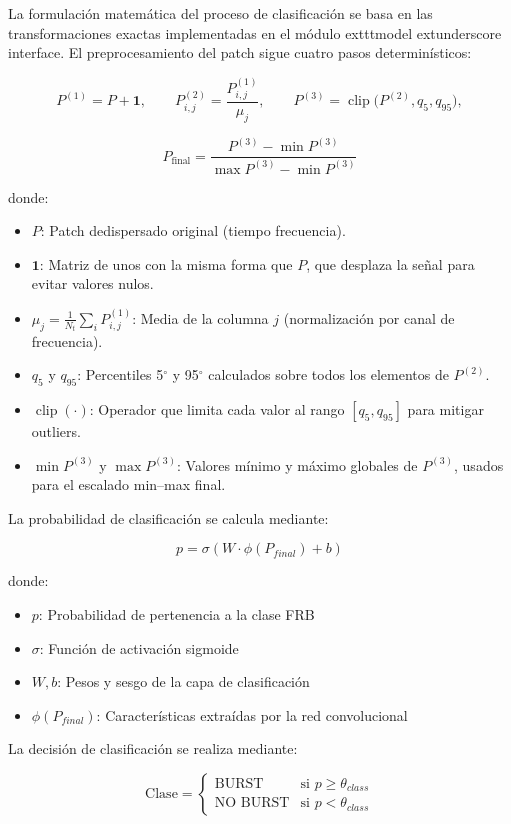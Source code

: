 La formulación matemática del proceso de clasificación se basa en las transformaciones exactas implementadas en el módulo 	exttt{model	extunderscore interface}. El preprocesamiento del patch sigue cuatro pasos determinísticos:

\[
P^{(1)} = P + \mathbf{1}, \qquad
P^{(2)}_{i,j} = \frac{P^{(1)}_{i,j}}{\mu_j}, \qquad
P^{(3)} = \operatorname{clip}\big(P^{(2)}, q_{5}, q_{95}\big),
\]

\[
P_{\text{final}} = \frac{P^{(3)} - \min P^{(3)}}{\max P^{(3)} - \min P^{(3)}}
\]

donde:
\begin{itemize}
    \item $P$: Patch dedispersado original (tiempo \texttimes{} frecuencia).
    \item $\mathbf{1}$: Matriz de unos con la misma forma que $P$, que desplaza la señal para evitar valores nulos.
    \item $\mu_j = \frac{1}{N_t} \sum_i P^{(1)}_{i,j}$: Media de la columna $j$ (normalización por canal de frecuencia).
    \item $q_{5}$ y $q_{95}$: Percentiles 5$^{\circ}$ y 95$^{\circ}$ calculados sobre todos los elementos de $P^{(2)}$.
    \item $\operatorname{clip}(\cdot)$: Operador que limita cada valor al rango $[q_{5}, q_{95}]$ para mitigar outliers.
    \item $\min P^{(3)}$ y $\max P^{(3)}$: Valores mínimo y máximo globales de $P^{(3)}$, usados para el escalado min--max final.
\end{itemize}

La probabilidad de clasificación se calcula mediante:

\[
p = \sigma(W \cdot \phi(P_{final}) + b)
\]

donde:
\begin{itemize}
    \item $p$: Probabilidad de pertenencia a la clase FRB
    \item $\sigma$: Función de activación sigmoide
    \item $W, b$: Pesos y sesgo de la capa de clasificación
    \item $\phi(P_{final})$: Características extraídas por la red convolucional
\end{itemize}

La decisión de clasificación se realiza mediante:

\[
\text{Clase} = \begin{cases} 
\text{BURST} & \text{si } p \geq \theta_{class} \\
\text{NO BURST} & \text{si } p < \theta_{class}
\end{cases}
\]

